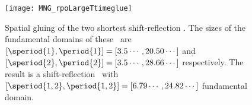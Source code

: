 \begin{figure}
\centering
\begin{minipage}[height=.4\textheight]{.66\textwidth}
\centering
\texttt{[image: MNG\_rpoLargeTtimeglue]}
\end{minipage}
\caption{ \label{fig:MNGppo12spaceglue2}
Spatial gluing of the two shortest shift-reflection
\twots. The sizes of the fundamental domains of these
\twots\ are
$[\speriod{1},\period{1}]=[3.5\cdots,20.50\cdots]$
and
$[\speriod{2},\period{2}]=[3.5\cdots,28.66\cdots]$
respectively.
The result is a
shift-reflection \twot\ with
$[\speriod{1,2},\period{1,2}]=[6.79\cdots,24.82\cdots]$
fundamental domain.
}
\end{figure}